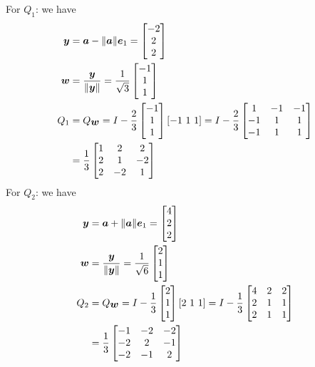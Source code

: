 \documentclass[12pt,a4paper]{article}
\def\a{ {\vc a} }
\def\e{ {\vc e} }
\def\y{ {\vc y} }
\def\w{ {\vc w} }
\begin{document}
For $Q_1$: we have
\begin{align*}
\ensuremath{\bm{\y}} &= \ensuremath{\bm{\a}} - \| \ensuremath{\bm{\a}}\| \ensuremath{\bm{\e}}_1 =  \begin{bmatrix} -2 \\ 2 \\ 2 \end{bmatrix} \\
\ensuremath{\bm{\w}} &= {\ensuremath{\bm{\y}} \over \|\ensuremath{\bm{\y}}\|} = {1 \over \sqrt{3}} \begin{bmatrix} -1 \\ 1 \\ 1 \end{bmatrix} \\
Q_1 &= Q_{\ensuremath{\bm{\w}}} = I - {2 \over 3} \begin{bmatrix} -1 \\ 1 \\ 1 \end{bmatrix}  [-1\ 1\ 1] = 
I - {2 \over 3} \begin{bmatrix} 1 & -1 & -1 \\ -1 & 1 & 1 \\ -1 & 1 & 1 \end{bmatrix} \\
&={1 \over 3} \begin{bmatrix} 1 & 2 & 2 \\ 2 & 1 & -2 \\ 2 & -2 & 1 \end{bmatrix} 
\end{align*}
For $Q_2$: we have
\begin{align*}
\ensuremath{\bm{\y}} &= \ensuremath{\bm{\a}} + \| \ensuremath{\bm{\a}}\| \ensuremath{\bm{\e}}_1 =  \begin{bmatrix} 4 \\ 2 \\ 2 \end{bmatrix} \\
\ensuremath{\bm{\w}} &= {\ensuremath{\bm{\y}} \over \|\ensuremath{\bm{\y}}\|} = {1 \over \sqrt{6}} \begin{bmatrix} 2 \\ 1 \\ 1 \end{bmatrix} \\
Q_2 &= Q_{\ensuremath{\bm{\w}}} = I - {1 \over 3} \begin{bmatrix} 2 \\ 1 \\ 1 \end{bmatrix}  [2\ 1\ 1] = 
I - {1 \over 3} \begin{bmatrix} 4 & 2 & 2 \\ 2 & 1  & 1 \\ 2&  1 & 1 \end{bmatrix} \\
&={1 \over 3} \begin{bmatrix} -1 & -2 & -2 \\ -2& 2 &-1 \\ -2& -1& 2 \end{bmatrix} 
\end{align*}
\end{document}
